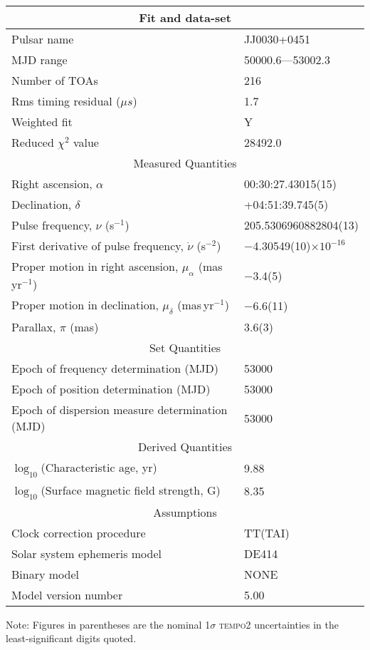\documentclass{article}
\begin{document}
\begin{table}
\begin{tabular}{ll}
\hline\hline
\multicolumn{2}{c}{Fit and data-set} \\
\hline
Pulsar name\dotfill & JJ0030+0451 \\ 
MJD range\dotfill & 50000.6---53002.3 \\ 
Number of TOAs\dotfill & 216 \\
Rms timing residual ($\mu s$)\dotfill & 1.7 \\
Weighted fit\dotfill &  Y \\ 
Reduced $\chi^2$ value \dotfill & 28492.0 \\
\hline
\multicolumn{2}{c}{Measured Quantities} \\ 
\hline
Right ascension, $\alpha$\dotfill &  00:30:27.43015(15) \\ 
Declination, $\delta$\dotfill & +04:51:39.745(5) \\ 
Pulse frequency, $\nu$ (s$^{-1}$)\dotfill & 205.5306960882804(13) \\ 
First derivative of pulse frequency, $\dot{\nu}$ (s$^{-2}$)\dotfill & $-$4.30549(10)$\times 10^{-16}$ \\ 
Proper motion in right ascension, $\mu_{\alpha}$ (mas\,yr$^{-1}$)\dotfill & $-$3.4(5) \\ 
Proper motion in declination, $\mu_{\delta}$ (mas\,yr$^{-1}$)\dotfill & $-$6.6(11) \\ 
Parallax, $\pi$ (mas)\dotfill & 3.6(3) \\ 
\hline
\multicolumn{2}{c}{Set Quantities} \\ 
\hline
Epoch of frequency determination (MJD)\dotfill & 53000 \\ 
Epoch of position determination (MJD)\dotfill & 53000 \\ 
Epoch of dispersion measure determination (MJD)\dotfill & 53000 \\ 
\hline
\multicolumn{2}{c}{Derived Quantities} \\
\hline
$\log_{10}$(Characteristic age, yr) \dotfill & 9.88 \\
$\log_{10}$(Surface magnetic field strength, G) \dotfill & 8.35 \\
\hline
\multicolumn{2}{c}{Assumptions} \\
\hline
Clock correction procedure\dotfill & TT(TAI) \\
Solar system ephemeris model\dotfill & DE414 \\
Binary model\dotfill & NONE \\
Model version number\dotfill & 5.00 \\ 
\hline
\end{tabular}
Note: Figures in parentheses are  the nominal 1$\sigma$ \textsc{tempo2} uncertainties in the least-significant digits quoted.
\end{table}
\end{document}
